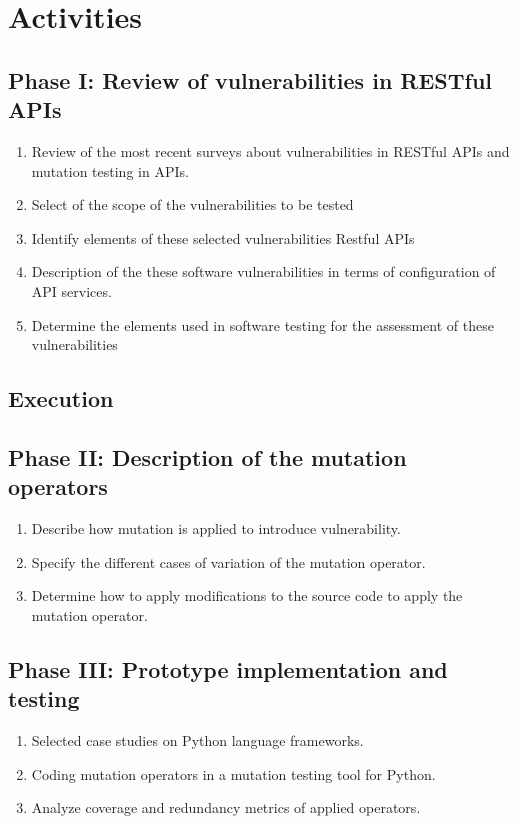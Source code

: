 \section{Activities}

\subsection{Phase I: Review of vulnerabilities in RESTful APIs}

\begin{enumerate}
    \item Review of the most recent surveys about vulnerabilities in RESTful APIs and mutation testing in APIs.
    \item Select of the scope of the vulnerabilities to be tested
    \item Identify elements of these selected vulnerabilities Restful APIs
    \item Description of the these software vulnerabilities in terms of configuration of API services.
    \item Determine the elements used in software testing for the assessment of these vulnerabilities
\end{enumerate}

\subsection{Execution}


\subsection{Phase II: Description of the mutation operators}

\begin{enumerate}
    \item Describe how mutation is applied to introduce vulnerability.
    \item Specify the different cases of variation of the mutation operator.
    \item Determine how to apply modifications to the source code to apply the mutation operator.
\end{enumerate}

\subsection{Phase III: Prototype implementation and testing}

\begin{enumerate}
    \item Selected case studies on Python language frameworks.
    \item Coding mutation operators in a mutation testing tool for Python.
    \item Analyze coverage and redundancy metrics of applied operators.
\end{enumerate}
